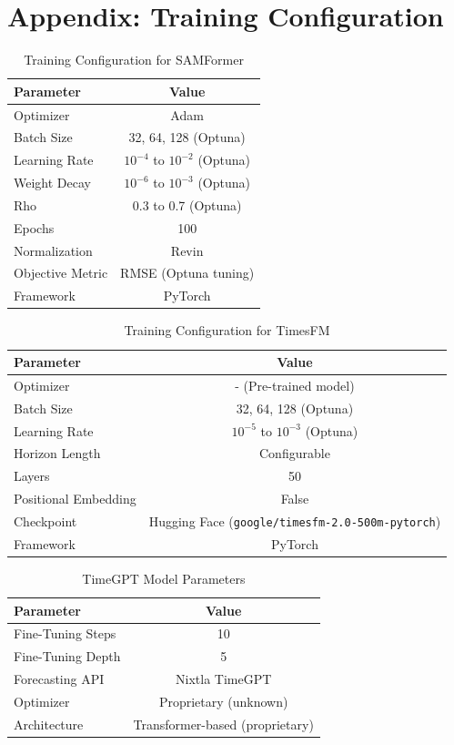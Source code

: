 \chapter{Appendix: Training Configuration}\label{appendixC}

\begin{table}[h!]
\centering
\begin{tabular}{lc}
\hline
\textbf{Parameter} & \textbf{Value} \\
\hline
Optimizer & Adam \\
Batch Size & 32, 64, 128 (Optuna) \\
Learning Rate & $10^{-4}$ to $10^{-2}$ (Optuna) \\
Weight Decay & $10^{-6}$ to $10^{-3}$ (Optuna) \\
Rho & 0.3 to 0.7 (Optuna) \\
Epochs & 100 \\
Normalization & Revin \\
Objective Metric & RMSE (Optuna tuning) \\
Framework & PyTorch \\
\hline
\end{tabular}
\caption{Training Configuration for SAMFormer}
\label{tab:samformer_training}
\end{table}

\begin{table}[h!]
\centering
\begin{tabular}{lc}
\hline
\textbf{Parameter} & \textbf{Value} \\
\hline
Optimizer & - (Pre-trained model) \\
Batch Size & 32, 64, 128 (Optuna) \\
Learning Rate & $10^{-5}$ to $10^{-3}$ (Optuna) \\
Horizon Length & Configurable \\
Layers & 50 \\
Positional Embedding & False \\
Checkpoint & Hugging Face (\texttt{google/timesfm-2.0-500m-pytorch}) \\
Framework & PyTorch \\
\hline
\end{tabular}
\caption{Training Configuration for TimesFM}
\label{tab:timesfm_training}
\end{table}

\begin{table}[h!]
\centering
\begin{tabular}{lc}
\hline
\textbf{Parameter} & \textbf{Value} \\
\hline
Fine-Tuning Steps & 10 \\
Fine-Tuning Depth & 5 \\
Forecasting API & Nixtla TimeGPT \\
Optimizer & Proprietary (unknown) \\
Architecture & Transformer-based (proprietary) \\
\hline
\end{tabular}
\caption{TimeGPT Model Parameters}
\label{tab:timegpt_parameters}
\end{table}

